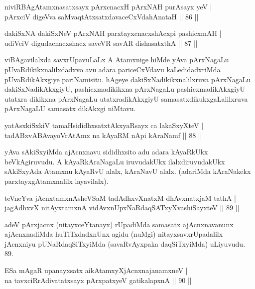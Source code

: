 \begin{shl}
niviRBAgAtamxnasatxsayx pArxcnacxH pArxNAH purA\s sayx yeV |\\
pArxciV digeVva saMvaqtAtxsatxdavaceCxVdahAnataH \hfill || 86 || 
\end{shl}

\begin{shl}
dakiSxNA dakiSxNeV pArxNAH parxtayxcnacxshAcxpi pashicxmAH |\\
udiVciV digudacnacxshacx saveVR savAR dishasatxthA \hfill || 87 || 
\end{shl}

\begin{artha}
viBAgavilalxda savxrUpavuLaLx A Atamxnige hiMde yAva pArxNagaLu pUvaRdikikxnalilxdadxvo avu adara pariceCxVdavu kaLedidadxriMda pUvaRdikAkxgiye pariNamisitu. hAgeye dakiSxNadikikxnalilxruva pArxNagaLu dakiSxNadikAkxgiyU, pashicxmadikikxna pArxNagaLu pashicxmadikAkxgiyU utatxra dikikxna pArxNagaLu utatxradikAkxgiyU samasatxdikukxgaLalilxruva pArxNagaLU samasatx dikAkxgi niMtavu.
\end{artha}

\begin{shl}
yatAsxkiSxkiV tamaHsididhxsatxtAkxyaRsayx ca lakaSxyXteV |\\
tadABxvABAvayoVrAtAmx na kAyaRM nApi kAraNamf \hfill || 88 || 
\end{shl}

\begin{artha}
yAva sAkiSxyiMda ajAcnxnavu sididhxsito adu adara kAyaRkUkx beVkAgiruvudu. A kAyaRkAraNagaLu iruvudakUkx ilalxdiruvudakUkx sAkiSxyAda Atamxnu kAyaRvU alalx, kAraNavU alalx. (adariMda kAraNakekx parxtayxgAtamxnalilx layavilalx). 
\end{artha}

\begin{shl}
teVneYva jAcnxtamxnA\s sheVSaM tadAdhxvXnatxM dhAvxnatxjaM tathA |\\
jagAdhxvX nitAyxtamxnA vidAvxnUpxNaRdaqSATxyX\s vashiSayxteV \hfill || 89 || 
\end{shl}

\begin{artha}
adeV pArxjacnx (nitayxceYtanayx) rUpadiMda samasatx ajAcnxnavanunx ajAcnxnadiMda huTiTxdadxnUnx agidu (nuMgi) nitayxsavxrUpadalilx jAcnxniyu pUNaRdaqSiTxyiMda (savaRvAyxpaka daqSiTxyiMda) uLiyuvudu. 89.
\end{artha}


\begin{shl}
ESa mAgaR upanayxsatx aikAtamxyXjAcnxnajanamxneV |\\
na tavxciRrAdivatatxsayx pArxpatxyeV gatikalapxnA \hfill || 90 || 
\end{shl}

